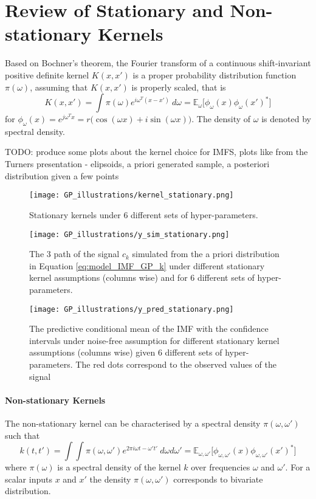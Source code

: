 \section{Review of Stationary and Non-stationary Kernels}
Based on Bochner's theorem, the Fourier transform of a continuous shift-invariant positive definite kernel $K(x,x')$ is a proper probability distribution function $\pi(\omega)$, assuming that $K(x,x')$ is properly scaled, that is
\begin{equation}
K(x,x') = \int \pi(\omega) e^{ i \omega^T (x - x') }\ d\omega = \mathbb{E}_{\omega}\big[ \phi_\omega (x) \phi_\omega (x')^* \big]
\end{equation}
for $\phi_\omega (x)  =e^{j \omega^T x} = r \big( \cos (\omega x ) + i \sin (\omega x )\big)$. The density of $\omega$ is denoted by spectral density.


TODO: produce some plots about the kernel choice for IMFS, plots like from the Turners presentation - elipsoids, a priori generated sample, a posteriori distribution given a few points


\begin{figure}[H]
\centering
\texttt{[image: GP\_illustrations/kernel\_stationary.png]}
\caption{Stationary kernels under 6 different sets of hyper-parameters.}\label{fig:}
\end{figure}

\begin{figure}[H]
\centering
\texttt{[image: GP\_illustrations/y\_sim\_stationary.png]}
\caption{The 3 path of the signal $c_k$ simulated from the a priori distribution in Equation \eqref{eq:model_IMF_GP_k} under different stationary kernel assumptions (columns wise) and for 6 different sets of hyper-parameters.}\label{fig:}
\end{figure}

\begin{figure}[H]
\centering
\texttt{[image: GP\_illustrations/y\_pred\_stationary.png]}
\caption{The predictive conditional mean of the IMF with the confidence intervals  under  noise-free assumption for different stationary kernel assumptions (columns wise) given 6 different sets of hyper-parameters. The red dots correspond to the observed values of the signal}\label{fig:}
\end{figure}



\paragraph{Non-stationary Kernels}
The non-stationary kernel can be characterised by a spectral density $\pi(\omega,\omega')$ such that
\begin{equation}
k(t,t') =\int \int \pi(\omega,\omega') e^{ 2 \pi i \omega t - \omega' t' }\ d\omega d\omega' = \mathbb{E}_{\omega,\omega'}\big[ \phi_{\omega,\omega'} (x) \phi_{\omega,\omega'} (x')^* \big]
\end{equation}
where $\pi(\omega)$ is a spectral density of the kernel $k$ over frequencies $\omega$ and $\omega'$. For a scalar inputs $x$ and $x'$ the density $\pi(\omega,\omega')$ corresponds to bivariate distribution.

